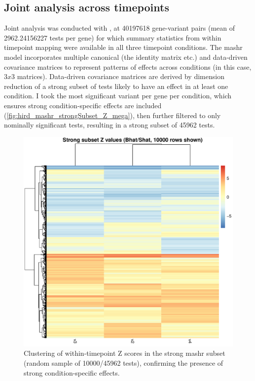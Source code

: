 \subsection{Joint  analysis across timepoints}

Joint analysis was conducted with \autocite{urbut2018FlexibleStatisticalMethods}, at 40197618 gene-variant pairs (mean of \num[round-mode=places,round-precision=0]{2962.24156227} tests per gene) for which summary statistics from within timepoint mapping were available in all three timepoint conditions.
The mashr model incorporates multiple canonical (the identity matrix etc.) and data-driven covariance matrices to represent patterns of effects across conditions (in this case, $3 x 3$ matrices).
Data-driven covariance matrices are derived by dimension reduction of a strong subset of tests likely to have an effect in at least one condition.
I took the most significant variant per gene per condition, 
which ensures strong condition-specific effects are included (\autoref{fig:hird_mashr_strongSubset_Z_mega}), 
then further filtered to only nominally significant tests, resulting in a strong subset of 45962 tests.

\begin{figure}
    \centering
    \includegraphics[width=1.0\textwidth,page=1]{mainmatter/figures/chapter_03/mash_mega/mashr.strong_subset_zval_heatmap.cisDist_1e6.sampleAcThresh_15.randomSubsetN_200000.pdf}
    \caption{Clustering of within-timepoint Z scores in the strong mashr subset (random sample of 10000/45962 tests), confirming the presence of strong condition-specific effects.}
    \label{fig:hird_mashr_strongSubset_Z_mega}
\end{figure}

